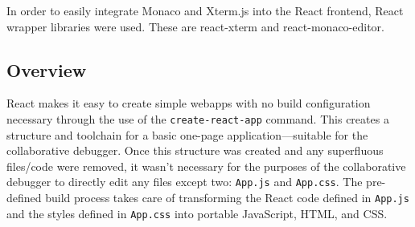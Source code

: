 \documentclass[12pt]{article}
\begin{document}
In order to easily integrate Monaco and Xterm.js into the React
frontend, React wrapper libraries were used.  These are
react-xterm\cite{reactxterm} and
react-monaco-editor\cite{reactmonaco}.

\subsection{Overview}






React makes it easy to create simple webapps with no build
configuration necessary through the use of the
\lstinline{create-react-app} command.  This creates a structure and
toolchain for a basic one-page application---suitable for the
collaborative debugger.  Once this structure was created and any
superfluous files/code were removed, it wasn't necessary for the
purposes of the collaborative debugger to directly edit any files
except two: \lstinline{App.js} and \lstinline{App.css}.  The
pre-defined build process takes care of transforming the React code
defined in \lstinline{App.js} and the styles defined in
\lstinline{App.css} into portable JavaScript, HTML, and CSS.
\par
\end{document}
